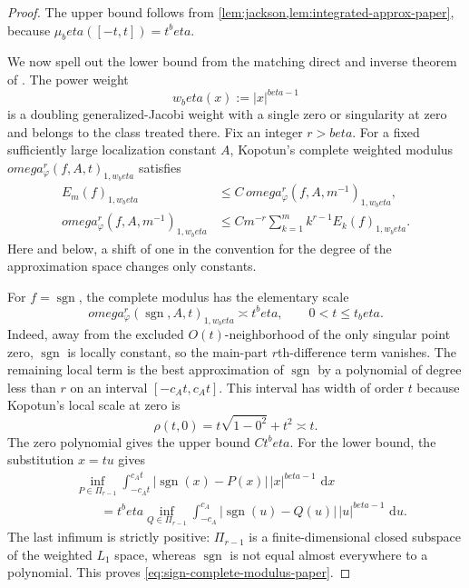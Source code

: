 \documentclass[11pt]{article}
\def\beta{beta}%
\def\omega{omega}%
\newcommand{\sgn}{\operatorname{sgn}}
\newcommand{\dd}{\,\mathrm d}
\newcommand\eed[1]{{\color{green!45!black} #1}}
\begin{document}
\begin{proof}
\eed{The upper bound follows from \cref{lem:jackson,lem:integrated-approx-paper}, because $\mu_\beta([-t,t])=t^\beta$.

We now spell out the lower bound from the matching direct and inverse theorem of \citet[Theorems~5.2 and~9.1, Corollary~11.1]{Kopotun}.  The power weight
\[
w_\beta(x):=|x|^{\beta-1}
\]
is a doubling generalized-Jacobi weight with a single zero or singularity at zero and belongs to the class treated there.  Fix an integer $r>\beta$.  For a fixed sufficiently large localization constant $A$, Kopotun's complete weighted modulus $\omega_\varphi^r(f,A,t)_{1,w_\beta}$ satisfies
\begin{align}
E_m(f)_{1,w_\beta}
&\le
C\,\omega_\varphi^r(f,A,m^{-1})_{1,w_\beta},
\label{eq:kopotun-direct-paper}\\
\omega_\varphi^r(f,A,m^{-1})_{1,w_\beta}
&\le
C m^{-r}\sum_{k=1}^m k^{r-1}E_k(f)_{1,w_\beta}.
\label{eq:kopotun-inverse-paper}
\end{align}
Here and below, a shift of one in the convention for the degree of the approximation space changes only constants.

For $f=\sgn$, the complete modulus has the elementary scale
\begin{equation}
\label{eq:sign-complete-modulus-paper}
\omega_\varphi^r(\sgn,A,t)_{1,w_\beta}
\asymp
t^\beta,
\qquad 0<t\le t_\beta.
\end{equation}
Indeed, away from the excluded $O(t)$-neighborhood of the only singular point zero, $\sgn$ is locally constant, so the main-part $r$th-difference term vanishes.  The remaining local term is the best approximation of $\sgn$ by a polynomial of degree less than $r$ on an interval $[-c_At,c_At]$.  This interval has width of order $t$ because Kopotun's local scale at zero is
\[
\rho(t,0)=t\sqrt{1-0^2}+t^2\asymp t.
\]
The zero polynomial gives the upper bound $Ct^\beta$.  For the lower bound, the substitution $x=tu$ gives
\begin{align*}
&\inf_{P\in\Pi_{r-1}}
\int_{-c_At}^{c_At}
|\sgn(x)-P(x)|\,|x|^{\beta-1}\,\dd x\\
&\qquad=
t^\beta
\inf_{Q\in\Pi_{r-1}}
\int_{-c_A}^{c_A}
|\sgn(u)-Q(u)|\,|u|^{\beta-1}\,\dd u.
\end{align*}
The last infimum is strictly positive: $\Pi_{r-1}$ is a finite-dimensional closed subspace of the weighted $L_1$ space, whereas $\sgn$ is not equal almost everywhere to a polynomial.  This proves \eqref{eq:sign-complete-modulus-paper}.

}
\end{proof}
\end{document}
